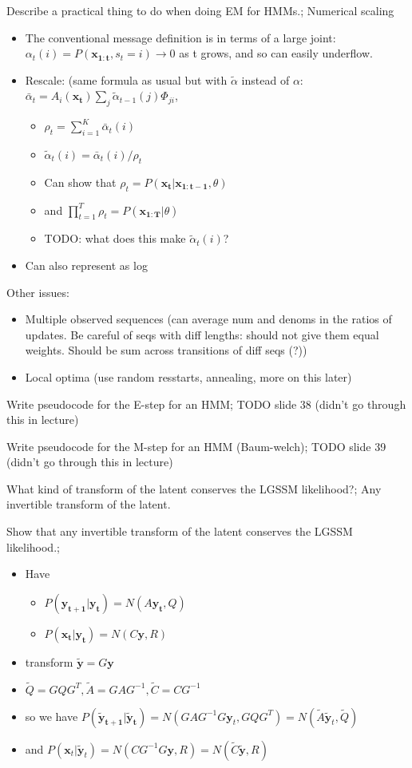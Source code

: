 \documentclass{article}
\begin{document}
Describe a practical thing to do when doing EM for HMMs.; Numerical scaling \begin{itemize} \item The conventional message definition is in terms of a large joint: $\alpha_t(i)=P(\mathbf{x_{1:t}},s_t=i)\rightarrow 0$ as t grows, and so can easily underflow. \item Rescale: (same formula as usual but with $\tilde{\alpha}$ instead of $\alpha$: $\bar{\alpha}_t=A_i(\mathbf{x_t})\sum_j\tilde{\alpha}_{t-1}(j)\Phi_{ji}$, \begin{itemize} \item $\rho_t = \sum_{i=1}^K\bar{\alpha}_t(i)$ \item $\tilde{\alpha}_t(i)=\bar{\alpha}_t(i)/\rho_t$ \item Can show that $\rho_t=P(\mathbf{x_t|x_{1:t-1}}, \theta)$ \item and $\prod_{t=1}^T\rho_t = P(\mathbf{x_{1:T}}|\theta)$ \item TODO: what does this make $\tilde{\alpha}_t(i)$? \end{itemize} \item Can also represent as log \end{itemize} Other issues: \begin{itemize} \item Multiple observed sequences (can average num and denoms in the ratios of updates. Be careful of seqs with diff lengths: should not give them equal weights. Should be sum across transitions of diff seqs (?)) \item Local optima (use random resstarts, annealing, more on this later) \end{itemize}

Write pseudocode for the E-step for an HMM; TODO slide 38 (didn't go through this in lecture)

Write pseudocode for the M-step for an HMM (Baum-welch); TODO slide 39 (didn't go through this in lecture)

What kind of transform of the latent conserves the LGSSM likelihood?; Any invertible transform of the latent. 

Show that any invertible transform of the latent conserves the LGSSM likelihood.; \begin{itemize} \item Have \begin{itemize} \item $P(\mathbf{y_{t+1}|y_t})=N(A\mathbf{y_t}, Q)$ \item $P(\mathbf{x_{t}|y_t})=N(C\mathbf{y}, R)$  \end{itemize} \item transform $\tilde{\mathbf{y}}=G\mathbf{y}$ \item $\tilde{Q}=GQG^T, \tilde{A}=GAG^{-1}, \tilde{C}=CG^{-1}$ \item so we have $P(\mathbf{\tilde{y}_{t+1}|\tilde{y}_t})=N(GAG^{-1}G\mathbf{y}_t, GQG^T)=N(\tilde{A}\tilde{\mathbf{y}}_t, \tilde{Q})$ \item and $P(\mathbf{x}_t| \mathbf{\tilde{y}}_t)=N(CG^{-1}G\mathbf{y}, R)=N(\tilde{C}\tilde{\mathbf{y}}, R)$ \end{itemize}
\end{document}
